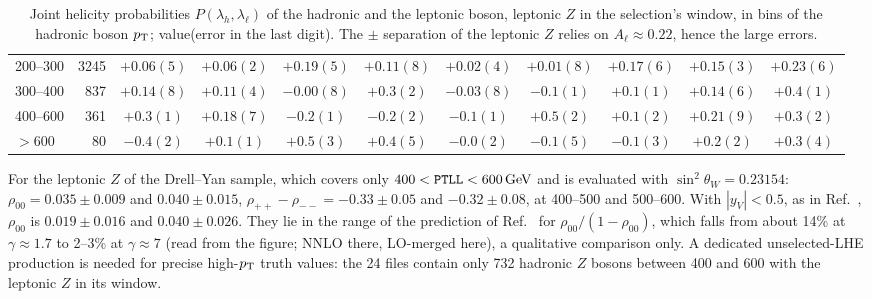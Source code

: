\begin{table}[htbp]
\begin{tabular}{lrccccccccc}
200--300 & 3245 & $+0.06(5)$ & $+0.06(2)$ & $+0.19(5)$ & $+0.11(8)$ & $+0.02(4)$ & $+0.01(8)$ & $+0.17(6)$ & $+0.15(3)$ & $+0.23(6)$ \\
300--400 & 837 & $+0.14(8)$ & $+0.11(4)$ & $-0.00(8)$ & $+0.3(2)$ & $-0.03(8)$ & $-0.1(1)$ & $+0.1(1)$ & $+0.14(6)$ & $+0.4(1)$ \\
400--600 & 361 & $+0.3(1)$ & $+0.18(7)$ & $-0.2(1)$ & $-0.2(2)$ & $-0.1(1)$ & $+0.5(2)$ & $+0.1(2)$ & $+0.21(9)$ & $+0.3(2)$ \\
$> 600$ & 80 & $-0.4(2)$ & $+0.1(1)$ & $+0.5(3)$ & $+0.4(5)$ & $-0.0(2)$ & $-0.1(5)$ & $-0.1(3)$ & $+0.2(2)$ & $+0.3(4)$ \\
\bottomrule
\end{tabular}
\caption{Joint helicity probabilities $P(\lambda_h, \lambda_\ell)$ of the hadronic and the leptonic boson, leptonic $Z$
in the selection's window, in bins of the hadronic boson $p_{\mathrm{T}}$; value(error in the last digit). The $\pm$ separation of
the leptonic $Z$ relies on $A_\ell \approx 0.22$, hence the large errors.}
\label{tab:app:truthJoint}
\end{table}

For the leptonic $Z$ of the Drell--Yan sample, which covers only $400 < \texttt{PTLL} < 600\,\mathrm{GeV}$ and is evaluated with
$\sin^2\theta_W = 0.23154$: $\rho_{00} = 0.035 \pm 0.009$ and $0.040 \pm 0.015$, $\rho_{++}-\rho_{--} = -0.33 \pm 0.05$
and $-0.32 \pm 0.08$, at 400--500 and 500--600\GeV. With $|y_V| < 0.5$, as in Ref.~\cite{Gao:2026bvp}, $\rho_{00}$ is
$0.019 \pm 0.016$ and $0.040 \pm 0.026$. They
lie in the range of the prediction of Ref.~\cite[Fig.~4]{Gao:2026bvp} for $\rho_{00}/(1-\rho_{00})$, which falls from
about 14\% at $\gamma \approx 1.7$ to 2--3\% at $\gamma \approx 7$ (read from the figure; NNLO there, LO-merged here), a
qualitative comparison only. A dedicated unselected-LHE production is needed for precise high-$p_{\mathrm{T}}$ truth values:
the 24  files contain only 732 hadronic $Z$ bosons between 400 and 600\GeV{} with the leptonic $Z$ in
its window.

